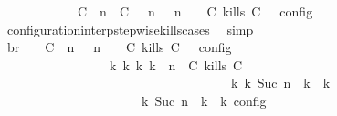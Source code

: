 \begin{isabellebody}
\ \ \ \ \ \ \ \ \ \ {\isasymunion}\ {\isasymlbrakk}\ {\isacharparenleft}{\isacharparenleft}C\ {\isasymUp}\ n{\isacharparenright}\ {\isacharhash}\ {\isacharparenleft}C\ {\isasymnot}{\isasymUp}\ {\isasymge}\ n{\isacharparenright}\ {\isacharhash}\ {\isasymGamma}{\isacharparenright}{\isacharcomma}\ n\ {\isasymturnstile}\ {\isasymPsi}\ {\isasymtriangleright}\ {\isacharparenleft}{\isacharparenleft}C\ kills\ C\ {\isacharhash}\ {\isasymPhi}{\isacharparenright}\ {\isasymrbrakk}\isactrlsub c\isactrlsub o\isactrlsub n\isactrlsub f\isactrlsub i\isactrlsub g{\isacartoucheclose}\isanewline
\ \ \ \ \ \ \ \ \isamarkupfalse%
\ configuration{\isacharunderscore}interp{\isacharunderscore}stepwise{\isacharunderscore}kills{\isacharunderscore}cases\ \isamarkupfalse%
\ simp\isanewline
\ \ \ \ \ \ \isamarkupfalse%
\ \isamarkupfalse%
\ br{}{\isacharcolon}\ {\isacartoucheopen}{\isasymrho}\ {\isasymin}\ {\isasymlbrakk}\ {\isacharparenleft}{\isacharparenleft}C\ {\isasymnot}{\isasymUp}\ n{\isacharparenright}\ {\isacharhash}\ {\isasymGamma}{\isacharparenright}{\isacharcomma}\ n\ {\isasymturnstile}\ {\isasymPsi}\ {\isasymtriangleright}\ {\isacharparenleft}{\isacharparenleft}C\ kills\ C\ {\isacharhash}\ {\isasymPhi}{\isacharparenright}\ {\isasymrbrakk}\isactrlsub c\isactrlsub o\isactrlsub n\isactrlsub f\isactrlsub i\isactrlsub g\isanewline
\ \ \ \ \ \ \ \ \ \ \ \ \ \ \ \ {\isasymLongrightarrow}\ {\isasymexists}{\isasymGamma}\isactrlsub k\ {\isasymPsi}\isactrlsub k\ {\isasymPhi}\isactrlsub k\ k{\isachardot}\ {\isacharparenleft}{\isacharparenleft}{\isasymGamma}{\isacharcomma}\ n\ {\isasymturnstile}\ {\isacharparenleft}{\isacharparenleft}C\ kills\ C\ {\isacharhash}\ {\isasymPsi}{\isacharparenright}\ {\isasymtriangleright}\ {\isasymPhi}{\isacharparenright}\isanewline
\ \ \ \ \ \ \ \ \ \ \ \ \ \ \ \ \ \ \ \ \ \ \ \ \ \ \ \ \ \ \ \ \ \ \ \ {\isasymhookrightarrow}\isactrlbsup k\isactrlesup \ {\isacharparenleft}{\isasymGamma}\isactrlsub k{\isacharcomma}\ Suc\ n\ {\isasymturnstile}\ {\isasymPsi}\isactrlsub k\ {\isasymtriangleright}\ {\isasymPhi}\isactrlsub k{\isacharparenright}{\isacharparenright}\isanewline
\ \ \ \ \ \ \ \ \ \ \ \ \ \ \ \ \ \ {\isasymand}\ {\isasymrho}\ {\isasymin}\ {\isasymlbrakk}\ {\isasymGamma}\isactrlsub k{\isacharcomma}\ Suc\ n\ {\isasymturnstile}\ {\isasymPsi}\isactrlsub k\ {\isasymtriangleright}\ {\isasymPhi}\isactrlsub k\ {\isasymrbrakk}\isactrlsub c\isactrlsub o\isactrlsub n\isactrlsub f\isactrlsub i\isactrlsub g{\isacartoucheclose}\isanewline

\end{isabellebody}
